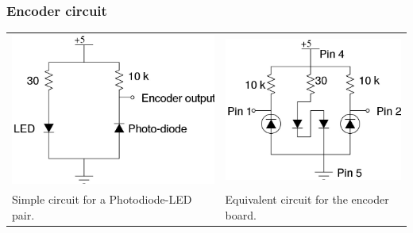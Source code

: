 \documentclass{beamer}
\begin{document}
  \begin{frame}
    \centering
    \frametitle{Encoder circuit}
    \begin{tabular}{p{} p{}}
      \includegraphics[scale=0.25]{../Report/SimpleEncoder.jpg} &
\includegraphics[scale=0.25]{../Report/EncoderCircuit.jpg} \\
      Simple circuit for a Photodiode-LED pair. &
Equivalent circuit for the encoder board.
    \end{tabular}
  \end{frame}
\end{document}
